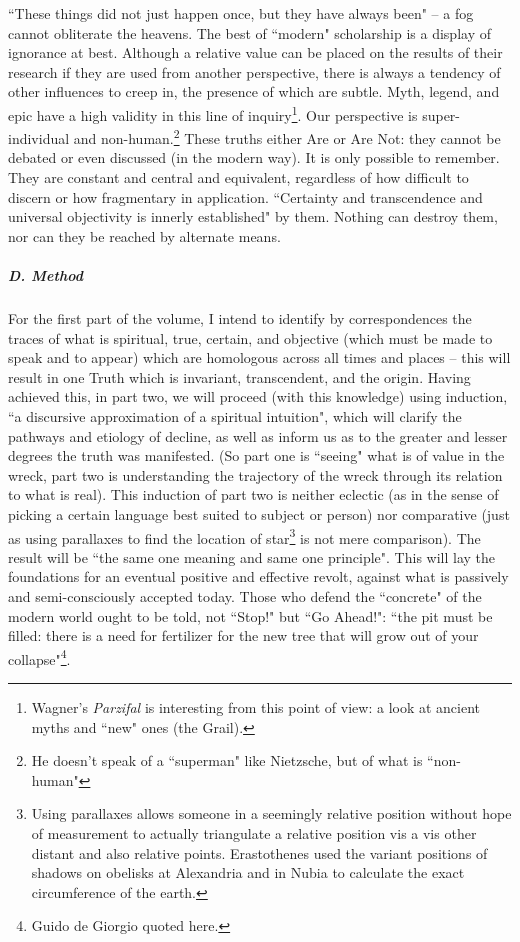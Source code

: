 ``These things did not just happen once, but they have always been" – a fog cannot obliterate the heavens. The best of ``modern" scholarship is a display of ignorance at best. Although a relative value can be placed on the results of their research if they are used from another perspective, there is always a tendency of other influences to creep in, the presence of which are subtle. Myth, legend, and epic have a high validity in this line of inquiry\footnote{Wagner's \emph{Parzifal} is interesting from this point of view: a look at ancient myths and ``new" ones (the Grail).}. Our perspective is super-individual and non-human.\footnote{He doesn't speak of a ``superman" like Nietzsche, but of what is ``non-human"} These truths either Are or Are Not: they cannot be debated or even discussed (in the modern way). It is only possible to remember. They are constant and central and equivalent, regardless of how difficult to discern or how fragmentary in application. ``Certainty and transcendence and universal objectivity is innerly established" by them. Nothing can destroy them, nor can they be reached by alternate means.

\subparagraph{D. Method}
For the first part of the volume, I intend to identify by correspondences the traces of what is spiritual, true, certain, and objective (which must be made to speak and to appear) which are homologous across all times and places – this will result in one Truth which is invariant, transcendent, and the origin. Having achieved this, in part two, we will proceed (with this knowledge) using induction, ``a discursive approximation of a spiritual intuition", which will clarify the pathways and etiology of decline, as well as inform us as to the greater and lesser degrees the truth was manifested. (So part one is ``seeing" what is of value in the wreck, part two is understanding the trajectory of the wreck through its relation to what is real). This induction of part two is neither eclectic (as in the sense of picking a certain language best suited to subject or person) nor comparative (just as using parallaxes to find the location of star\footnote{Using parallaxes allows someone in a seemingly relative position without hope of measurement to actually triangulate a relative position vis a vis other distant and also relative points. Erastothenes used the variant positions of shadows on obelisks at Alexandria and in Nubia to calculate the exact circumference of the earth.} is not mere comparison). The result will be ``the same one meaning and same one principle". This will lay the foundations for an eventual positive and effective revolt, against what is passively and semi-consciously accepted today. Those who defend the ``concrete" of the modern world ought to be told, not ``Stop!" but ``Go Ahead!": ``the pit must be filled: there is a need for fertilizer for the new tree that will grow out of your collapse"\footnote{Guido de Giorgio quoted here.}.


